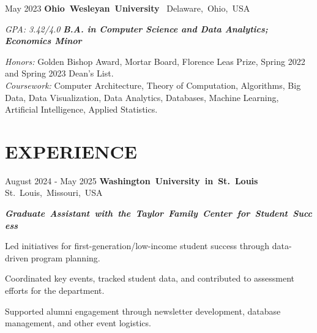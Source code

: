 \documentclass[10pt, letterpaper]{article}
\begin{document}
\vspace{\entrySpacing}
\begin{twocolentry}{May 2023}
    \mbox{\textbf{Ohio Wesleyan University}
        \kern {}
        \AND
        \kern {}}
    \mbox{Delaware, Ohio, USA}
\end{twocolentry}

\begin{twocolentry}{\textsl{GPA: 3.42/4.0}}
    {\textbf{\textsl{B.A. in Computer Science and Data Analytics; Economics Minor}}}
\end{twocolentry}

\begin{onecolentry}
    \begin{highlights}
        \textit{Honors:} Golden Bishop Award, Mortar Board, Florence Leas Prize, Spring 2022 and Spring 2023 Dean's List.\\
        \textit{Coursework:} Computer Architecture, Theory of Computation, Algorithms, Big Data, Data Visualization, Data Analytics, Databases, Machine Learning, Artificial Intelligence, Applied Statistics.\\
    \end{highlights}
\end{onecolentry}

\vspace{\headerSpacing}
\section{EXPERIENCE}

\vspace{\entrySpacing}
\begin{twocolentry}{August 2024 - May 2025}
    \mbox{\textbf{Washington University in St. Louis}
        \kern {}
        \AND
        \kern {}}
    \mbox{St. Louis, Missouri, USA}
\end{twocolentry}

\mbox{\textbf{\textsl{Graduate Assistant with the Taylor Family Center for Student Success}}}
\begin{onecolentry}
    \begin{highlightsforbulletentries}
        \item Led initiatives for first-generation/low-income student success through data-driven program planning.
        \item Coordinated key events, tracked student data, and contributed to assessment efforts for the department.
        \item Supported alumni engagement through newsletter development, database management, and other event logistics.
    \end{highlightsforbulletentries}
\end{onecolentry}
\end{document}
